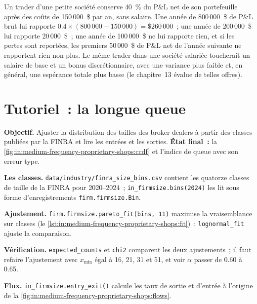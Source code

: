 \begin{example}\label{ex:in:medium-frequency-proprietary-shops:split}
Un trader d'une petite société conserve 40~\% du P\&L net de son portefeuille après des coûts de 150\,000~\$ par an, sans salaire. Une année de
800\,000~\$ de P\&L brut lui rapporte $0.4\times(800\,000-150\,000)=\$260\,000$~; une année de 200\,000~\$ lui rapporte 20\,000~\$~; une année de
100\,000~\$ ne lui rapporte rien, et si les pertes sont reportées, les premiers 50\,000~\$ de P\&L net de l'année suivante ne rapportent rien non plus.
Le même trader dans une société salariée toucherait un salaire de base et un bonus discrétionnaire, avec une variance plus faible et, en général,
une espérance totale plus basse (le chapitre~13 évalue de telles offres).
\end{example}

\section{Tutoriel~: la longue queue}\label{tut:in:medium-frequency-proprietary-shops:tut}

\begin{tutorial}
\textbf{Objectif.} Ajuster la distribution des tailles des broker-dealers à partir des classes publiées par la FINRA et lire les entrées et les sorties.
\textbf{État final~:} la \cref{fig:in:medium-frequency-proprietary-shops:ccdf} et l'indice de queue avec son erreur type.
\begin{tutsteps}
\item \textbf{Les classes.} \texttt{data/industry/finra\_size\_bins.csv} contient les quatorze classes de taille de la FINRA pour 2020--2024~;
\texttt{in\_firmsize.bins(2024)} les lit sous forme d'enregistrements \texttt{firm.firmsize.Bin}.
\item \textbf{Ajustement.} \texttt{firm.firmsize.pareto\_fit(bins, 11)} maximise la vraisemblance sur classes
(le \cref{lst:in:medium-frequency-proprietary-shops:fit})~; \texttt{lognormal\_fit} ajuste la comparaison.
\label{lst:in:medium-frequency-proprietary-shops:fit}
\item \textbf{Vérification.} \texttt{expected\_counts} et \texttt{chi2} comparent les deux ajustements~; il faut refaire l'ajustement avec $x_{\min}$ égal à 16, 21,
31 et 51, et voir $\alpha$ passer de 0.60 à 0.65.
\item \textbf{Flux.} \texttt{in\_firmsize.entry\_exit()} calcule les taux de sortie et d'entrée à l'origine de la
\cref{fig:in:medium-frequency-proprietary-shops:flows}.
\end{tutsteps}
\end{tutorial}

